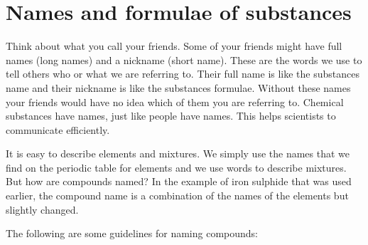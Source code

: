            \section{Names and formulae of substances}
            \nopagebreak
      \label{m38708*eip-379}Think about what you call your friends. Some of your friends might have full names (long names) and a nickname (short name). These are the words we use to tell others who or what we are referring to. Their full name is like the substances name and their nickname is like the substances formulae. Without these names your friends would have no idea which of them you are referring to. Chemical substances have names, just like people have names. This helps scientists to communicate efficiently.     \par \label{m38708*id64028}It is easy to describe elements and mixtures. We simply use the names that we find on the periodic table for elements and we use words to describe mixtures. But how are compounds named? In the example of iron sulphide that was used earlier, the compound name is a combination of the names of the elements but slightly changed. \par 
{} 
      \label{m38708*id64033}The following are some guidelines for naming compounds:\par 
